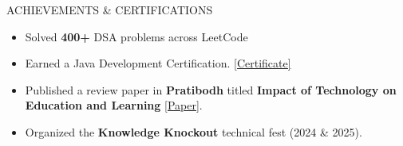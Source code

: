 \documentclass{resume}
\begin{document}
\begin{rSection}{ACHIEVEMENTS \& CERTIFICATIONS}
\vspace{-2pt}
\begin{itemize}[leftmargin=*, itemsep=-3pt, topsep=0pt]
\item Solved \textbf{400+} DSA problems across LeetCode
\item Earned a Java Development Certification.
\href{https://drive.google.com/file/d/19W0G-xFzkwkhkULccCE2gLa9lP_WyJ1U/view?usp=drive_link}{[Certificate]}
\item Published a review paper in \textbf{Pratibodh} titled \textbf{Impact of Technology on Education and Learning}
\href{https://pratibodh.org/index.php/pratibodh/article/view/345}{[Paper]}.
\item Organized the \textbf{Knowledge Knockout} technical fest (2024 \& 2025).
\end{itemize}
\end{rSection}
\end{document}
